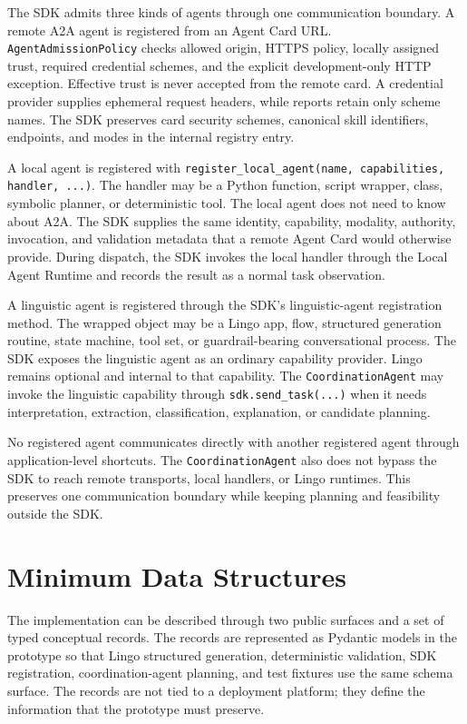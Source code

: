 The SDK admits three kinds of agents through one communication boundary. A remote A2A agent is registered from an Agent Card URL. \texttt{AgentAdmissionPolicy} checks allowed origin, HTTPS policy, locally assigned trust, required credential schemes, and the explicit development-only HTTP exception. Effective trust is never accepted from the remote card. A credential provider supplies ephemeral request headers, while reports retain only scheme names. The SDK preserves card security schemes, canonical skill identifiers, endpoints, and modes in the internal registry entry.

A local agent is registered with \texttt{register\_local\_agent(name, capabilities, handler, ...)}. The handler may be a Python function, script wrapper, class, symbolic planner, or deterministic tool. The local agent does not need to know about A2A. The SDK supplies the same identity, capability, modality, authority, invocation, and validation metadata that a remote Agent Card would otherwise provide. During dispatch, the SDK invokes the local handler through the Local Agent Runtime and records the result as a normal task observation.

A linguistic agent is registered through the SDK's linguistic-agent registration method. The wrapped object may be a Lingo app, flow, structured generation routine, state machine, tool set, or guardrail-bearing conversational process. The SDK exposes the linguistic agent as an ordinary capability provider. Lingo remains optional and internal to that capability. The \texttt{CoordinationAgent} may invoke the linguistic capability through \texttt{sdk.send\_task(...)} when it needs interpretation, extraction, classification, explanation, or candidate planning.

No registered agent communicates directly with another registered agent through application-level shortcuts. The \texttt{CoordinationAgent} also does not bypass the SDK to reach remote transports, local handlers, or Lingo runtimes. This preserves one communication boundary while keeping planning and feasibility outside the SDK.

\section{Minimum Data Structures}
\label{sec:data-structures}

The implementation can be described through two public surfaces and a set of typed conceptual records. The records are represented as Pydantic models in the prototype so that Lingo structured generation, deterministic validation, SDK registration, coordination-agent planning, and test fixtures use the same schema surface. The records are not tied to a deployment platform; they define the information that the prototype must preserve.

